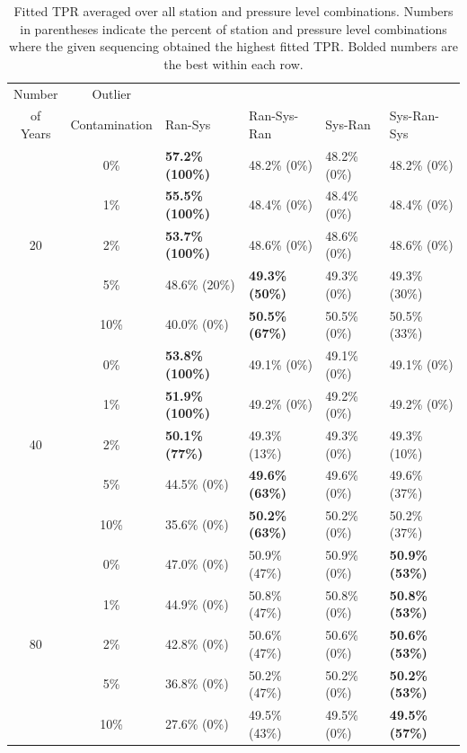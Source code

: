 \documentclass[12pt]{article}
\begin{document}
\begin{landscape}
\begin{table}[ht]
	\centering
	\begin{tabular}{cc|llll}
	  \hline
	  Number & Outlier & & & &\\
	  of Years & Contamination & Ran-Sys & Ran-Sys-Ran & Sys-Ran & Sys-Ran-Sys\\ 
	  \hline
	  & 0\% & \textbf{57.2\% (100\%)} & 48.2\% (0\%) & 48.2\% (0\%) & 48.2\% (0\%) \\ 
	  & 1\% & \textbf{55.5\% (100\%)} & 48.4\% (0\%) & 48.4\% (0\%) & 48.4\% (0\%) \\ 
	  20 & 2\% & \textbf{53.7\% (100\%)} & 48.6\% (0\%) & 48.6\% (0\%) & 48.6\% (0\%) \\ 
	  & 5\% & 48.6\% (20\%) & \textbf{49.3\% (50\%)} & 49.3\% (0\%) & 49.3\% (30\%) \\ 
	  & 10\% & 40.0\% (0\%) & \textbf{50.5\% (67\%)} & 50.5\% (0\%) & 50.5\% (33\%) \\
	  \hline
	  & 0\% & \textbf{53.8\% (100\%)} & 49.1\% (0\%) & 49.1\% (0\%) & 49.1\% (0\%) \\ 
	  & 1\% & \textbf{51.9\% (100\%)} & 49.2\% (0\%) & 49.2\% (0\%) & 49.2\% (0\%) \\ 
	  40 & 2\% & \textbf{50.1\% (77\%)} & 49.3\% (13\%) & 49.3\% (0\%) & 49.3\% (10\%) \\ 
	  & 5\% & 44.5\% (0\%) & \textbf{49.6\% (63\%)} & 49.6\% (0\%) & 49.6\% (37\%) \\ 
	  & 10\% & 35.6\% (0\%) & \textbf{50.2\% (63\%)} & 50.2\% (0\%) & 50.2\% (37\%) \\ 
	  \hline
	  & 0\% & 47.0\% (0\%) & 50.9\% (47\%) & 50.9\% (0\%) & \textbf{50.9\% (53\%)} \\ 
	  & 1\% & 44.9\% (0\%) & 50.8\% (47\%) & 50.8\% (0\%) & \textbf{50.8\% (53\%)} \\ 
	  80 & 2\% & 42.8\% (0\%) & 50.6\% (47\%) & 50.6\% (0\%) & \textbf{50.6\% (53\%)} \\ 
	  & 5\% & 36.8\% (0\%) & 50.2\% (47\%) & 50.2\% (0\%) & \textbf{50.2\% (53\%)} \\ 
	  & 10\% & 27.6\% (0\%) & 49.5\% (43\%) & 49.5\% (0\%) & \textbf{49.5\% (57\%)} \\ 
	  \hline
	\end{tabular}
	\caption{Fitted TPR averaged over all station and pressure level combinations.  Numbers in parentheses indicate the percent of station and pressure level combinations where the given sequencing obtained the highest fitted TPR. Bolded numbers are the best within each row.}
	\label{tab:fitTPR}
\end{table}
\end{landscape}
\end{document}
